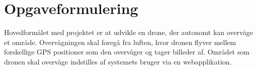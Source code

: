 \chapter{Opgaveformulering}
\label{chap:opgaveformulering}

Hovedformålet med projektet er at udvikle en drone, der autonomt kan overvåge et område. Overvågningen skal foregå fra luften, hvor dronen flyver mellem forskellige GPS positioner som den overvåger og tager billeder af. Området som dronen skal overvåge indstilles af systemets bruger via en webapplikation.

